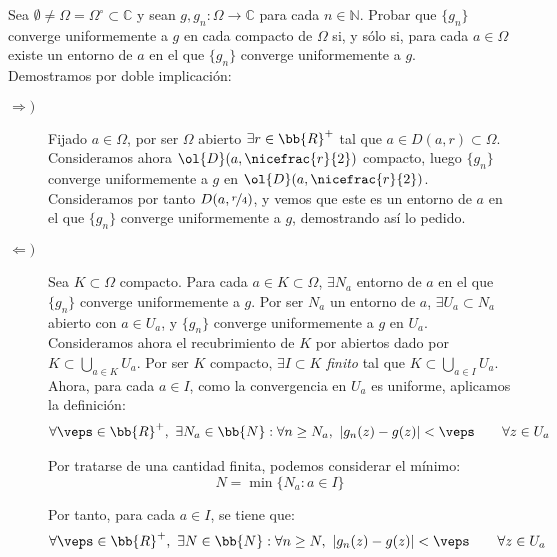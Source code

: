 \documentclass[12pt]{article}
\begin{document}
    \begin{ejercicio}
        Sea $\emptyset\neq \Omega=\Omega^\circ \subset \mathbb{C}$ y sean $g, g_n : \Omega \to \mathbb{C}$ para cada $n \in \mathbb{N}$. Probar que $\{g_n\}$ converge uniformemente a $g$ en cada compacto de $\Omega$ si, y sólo si, para cada $a \in \Omega$ existe un entorno de $a$ en el que $\{g_n\}$ converge uniformemente a $g$.\\
        
        Demostramos por doble implicación:
        \begin{description}
            \item[$\Longrightarrow)$] Fijado $a\in \Omega$, por ser $\Omega$ abierto $\exists r\in \bb{R}^+$ tal que $a\in D(a,r)\subset \Omega$. Consideramos ahora $\ol{D}(a,\nicefrac{r}{2})$ compacto, luego $\{g_n\}$ converge uniformemente a $g$ en $\ol{D}(a,\nicefrac{r}{2})$. Consideramos por tanto $D(a,\nicefrac{r}{4})$, y vemos que este es un entorno de $a$ en el que $\{g_n\}$ converge uniformemente a $g$, demostrando así lo pedido.
            
            \item[$\Longleftarrow)$] Sea $K\subset \Omega$ compacto. Para cada $a\in K\subset \Omega$, $\exists N_a$ entorno de $a$ en el que $\{g_n\}$ converge uniformemente a $g$. Por ser $N_a$ un entorno de $a$, $\exists U_a\subset N_a$ abierto con $a\in U_a$, y $\{g_n\}$ converge uniformemente a $g$ en $U_a$.\\
            
            Consideramos ahora el recubrimiento de $K$ por abiertos dado por $K\subset \bigcup\limits_{a\in K} U_a$. Por ser $K$ compacto, $\exists I\subset K$ \emph{finito} tal que $K\subset \bigcup\limits_{a\in I} U_a$. Ahora, para cada $a\in I$, como la convergencia en $U_a$ es uniforme, aplicamos la definición:
            \begin{align*}
                \forall \veps\in \bb{R}^+,\ \exists N_a\in \bb{N} : \forall n\geq N_a,\ |g_n(z)-g(z)|<\veps\qquad \forall z\in U_a
            \end{align*}

            Por tratarse de una cantidad finita, podemos considerar el mínimo:
            \begin{equation*}
                N=\min\{N_a : a\in I\}
            \end{equation*}

            Por tanto, para cada $a\in I$, se tiene que:
            \begin{align*}
                \forall \veps\in \bb{R}^+,\ \exists N\in \bb{N} : \forall n\geq N,\ |g_n(z)-g(z)|<\veps\qquad \forall z\in U_a
            \end{align*}


\end{description}
\end{ejercicio}
\end{document}
